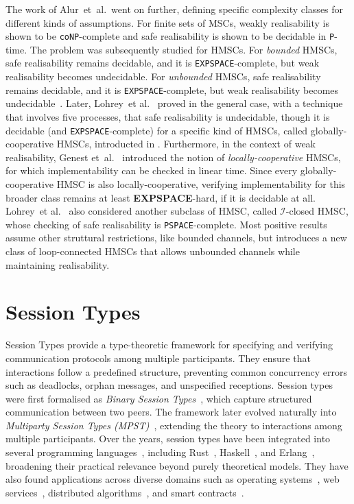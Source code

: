 The work of Alur~et~al.~went on further, defining specific complexity classes 
for different kinds of assumptions. For finite sets of MSCs,
weakly realisability is shown to be \verb|coNP|-complete and safe 
realisability is shown to be decidable in \verb|P|-time. The problem
was subsequently studied for HMSCs. For \emph{bounded} HMSCs, safe realisability 
remains decidable, and it is \verb|EXPSPACE|-complete, but weak realisability 
becomes undecidable. For \emph{unbounded} HMSCs, 
safe realisability remains decidable, and it is \verb|EXPSPACE|-complete, but weak realisability 
becomes undecidable~\cite{alur2005realizability}. 
Later, Lohrey~et al.~\cite{lohrey2003realizability} proved in the general case, 
with a technique that involves five processes, that safe realisability 
is undecidable, though it is decidable (and \verb|EXPSPACE|-complete) 
for a specific kind of HMSCs, called globally-cooperative HMSCs, introducted 
in \cite{morin2002recognizable}.
Furthermore, in the context of weak realisability,
Genest et~al.~\cite{genest2006infinite} introduced the notion of
\emph{locally-cooperative} HMSCs, for which implementability can be
checked in linear time.
Since every globally-cooperative HMSC is also locally-cooperative,
verifying implementability for this broader class remains at least
\textbf{EXPSPACE}-hard, if it is decidable at all.
Lohrey~et al.~\cite{lohrey2003realizability} also considered another subclass of HMSC,
called $\mathcal{I}$-closed HMSC, whose checking of safe realisability is \verb|PSPACE|-complete.
Most positive results assume other struttural restrictions, like bounded channels, 
but \cite{bollig2025high} introduces a new class of loop-connected HMSCs
that allows unbounded channels while maintaining realisability.

\section{Session Types}
Session Types provide a type-theoretic framework for specifying and verifying 
communication protocols among multiple participants.  
They ensure that interactions follow a predefined structure, 
preventing common concurrency errors such as deadlocks, orphan messages, 
and unspecified receptions. 
Session types were first formalised as 
\emph{Binary Session Types}~\cite{honda1993types}, 
which capture structured communication between two peers.  
The framework later evolved naturally into 
\emph{Multiparty Session Types (MPST)}~\cite{honda2008multiparty}, 
extending the theory to interactions among multiple participants.  
Over the years, session types have been integrated into several programming 
languages~\cite{ancona2016behavioral}, including 
Rust~\cite{jespersen2015session,chen2020ferrite}, 
Haskell~\cite{lindley2016embedding}, and 
Erlang~\cite{mostrous2011session}, 
broadening their practical relevance beyond purely theoretical models.  
They have also found applications across diverse domains such as 
operating systems~\cite{fahndrich2006language}, 
web services~\cite{yoshida2013scribble}, 
distributed algorithms~\cite{kouzapas2024session}, 
and smart contracts~\cite{das2021resource}.  

